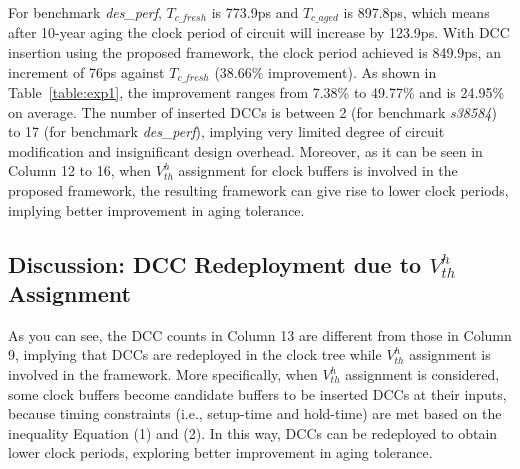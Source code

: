For benchmark \textit{des\_perf}, $T_{c\_fresh}$ is 773.9ps and $T_{c\_aged}$ is 897.8ps, which means after 10-year aging the clock period of circuit will increase by 123.9ps. With DCC insertion using the proposed framework, the clock period achieved is 849.9ps, an increment of 76ps against $T_{c\_fresh}$ (38.66\% improvement). As shown in Table~\ref{table:exp1}, the improvement ranges from 7.38\% to 49.77\% and is 24.95\% on average. \iffalse As shown in Table~\ref{table:exp2}.\fi The number of inserted DCCs is between 2 (for benchmark \textit{s38584}) to 17 (for benchmark \textit{des\_perf}), implying very limited degree of circuit modification and insignificant design overhead. Moreover, as it can be seen in Column 12 to 16, when $V_{th}^h$ assignment for clock buffers is involved in the proposed framework, the resulting framework can give rise to lower clock periods, implying better improvement in aging tolerance. 

\subsection{Discussion: DCC Redeployment due to $V_{th}^h$ Assignment}
As you can see, the DCC counts in Column 13 are different from those in Column 9, implying that DCCs are redeployed in the clock tree while $V_{th}^h$ assignment is involved in the framework. More specifically, when $V_{th}^h$ assignment is considered, some clock buffers become candidate buffers to be inserted DCCs at their inputs, because timing constraints (i.e., setup-time and hold-time) are met based on the inequality Equation (1) and (2). In this way, DCCs can be redeployed to obtain lower clock periods, exploring better improvement in aging tolerance.




